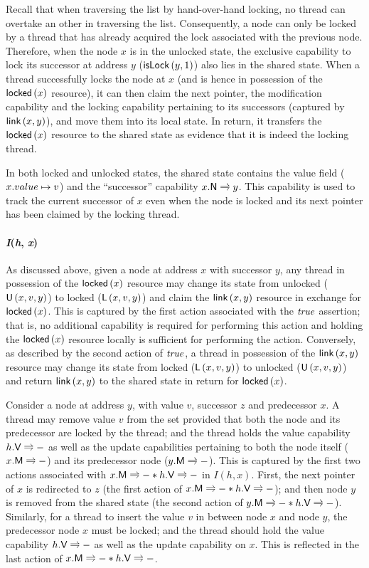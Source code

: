 %
Recall that when traversing the list by hand-over-hand locking, no thread can overtake an other in traversing the list. Consequently, a node can only be locked by a thread that has already acquired the lock associated with the previous node. Therefore, when the node $x$ is in the unlocked state, the exclusive capability to lock its successor at address $y$ ($\textsf{isLock}\left(y, 1\right)$) also lies in the shared state.
%
When a thread successfully locks the node at $x$ (and is hence in possession of the $\textsf{locked}\left(x \right)$ resource), it can then claim the next pointer, the modification capability and the locking capability pertaining to its successors (captured by $\textsf{link}\left(x, y \right)$), and move them into its local state. In return, it transfers the $\textsf{locked}\left(x \right)$ resource to the shared state as evidence that it is indeed the locking thread.

In both locked and unlocked states, the shared state contains the value field ($x.value \mapsto v$) and the ``successor'' capability $\nextC{x}{y}$. This capability is used to track the current successor of $x$ even when the node is locked and its next pointer has been claimed by the locking thread. 

\paragraph{\textit{I}(\textit{h}, \textit{x})} As discussed above, given a node at address $x$ with successor $y$, any thread in possession of the $\textsf{locked}\left(x \right)$ resource may change its state from unlocked ($\textsf{U}\left(x, v, y\right)$) to locked ($\textsf{L}\left(x, v, y\right)$) and claim the $\textsf{link}\left(x, y \right)$ resource in exchange for $\textsf{locked}\left(x \right)$. This is captured by the first action associated with the $\mathit{true}$ assertion; that is, no additional capability is required for performing this action and holding the $\textsf{locked}\left(x \right)$ resource locally is sufficient for performing the action. Conversely, as described by the second action of $\mathit{true}$, a thread in possession of the $\textsf{link}\left(x, y \right)$ resource may change its state from locked ($\textsf{L}\left(x, v, y\right)$) to unlocked ($\textsf{U}\left(x, v, y\right)$) and return $\textsf{link}\left(x, y \right)$ to the shared state in return for $\textsf{locked}\left(x \right)$. 

Consider a node at address $y$, with value $v$, successor $z$ and predecessor $x$. A thread may remove value $v$ from the set provided that both the node and its predecessor are locked by the thread; and the thread holds the value capability $\valueC{h}{v}$ as well as the update capabilities pertaining to both the node itself ($\modC{x}$) and its predecessor node ($\modC{y}$). This is captured by the first two actions associated with $\modC{x} * \valueC{h}{v}$ in $I(h, x)$. First, the next pointer of $x$ is redirected to $z$ (the first action of $\modC{x} * \valueC{h}{v}$); and then node $y$ is removed from the shared state (the second action of $\modC{y} * \valueC{h}{v}$).
Similarly, for a thread to insert the value $v$ in between node $x$ and node $y$, the predecessor node $x$ must be locked; and the thread should hold the value capability $\valueC{h}{v}$ as well as the update capability on $x$. This is reflected in the last action of $\modC{x} * \valueC{h}{v}$.

